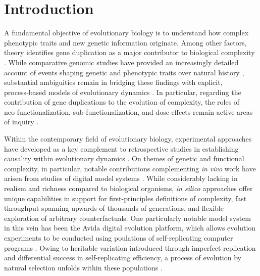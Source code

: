 \section{Introduction} \label{sec:introduction}

A fundamental objective of evolutionary biology is to understand how complex phenotypic traits and new genetic information originate.
Among other factors, theory identifies gene duplication as a major contributor to biological complexity \citep{Zhang2003,Otto2000,Wagner2008,Wagner2007,Crow:2006role,Magadum:2013wu,Metz:chromosomeDuplication1947}.
While comparative genomic studies have provided an increasingly detailed account of events shaping genetic and phenotypic traits over natural history \citep{Zhang2014}, substantial ambiguities remain in bridging these findings with explicit, process‑based models of evolutionary dynamics \citep{Welch2016}.
In particular, regarding the contribution of gene duplications to the evolution of complexity, the roles of neo‑functionalization, sub‑functionalization, and dose effects remain active areas of inquiry \citep{Innan2010}.

Within the contemporary field of evolutionary biology, experimental approaches have developed as a key complement to retrospective studies in establishing causality within evolutionary dynamics \citep{Kawecki2012}.
On themes of genetic and functional complexity, in particular, notable contributions complementing \textit{in vivo} work have arisen from studies of digital model systems \citep{Fortuna2022}.
While considerably lacking in realism and richness compared to biological organisms, \textit{in silico} approaches offer unique capabilities in support for first-principles definitions of complexity, fast throughput spanning upwards of thousands of generations, and flexible exploration of arbitrary counterfactuals.
One particularly notable model system in this vein has been the Avida digital evolution platform, which allows evolution experiments to be conducted using poulations of self-replicating computer programs \citep{Ofria:2009avida}.
Owing to heritable variation introduced through imperfect replication and differential success in self-replicating efficiency, a process of evolution by natural selection unfolds within these populations \citep{pennock2007models}.

